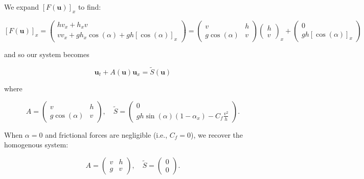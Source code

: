 We expand $[F(\textbf{u})]_x$ to find:

$$
[F(\textbf{u})]_x = \begin{pmatrix}
    h v_x + h_x v \\
    v v_x + g h_x \cos{(\alpha)} + g h [\cos{(\alpha)}]_x
\end{pmatrix} = \begin{pmatrix}
    v                & h \\
    g \cos{(\alpha)} & v
\end{pmatrix} \begin{pmatrix}
    h \\
    v
\end{pmatrix}_x + \begin{pmatrix}
    0 \\
    g h [\cos{(\alpha)}]_x
\end{pmatrix}
$$

and so our system becomes

$$
\textbf{u}_t + A(\textbf{u}) \textbf{u}_x = \tilde{S}(\textbf{u})
$$

where 

$$
A = \begin{pmatrix}
    v                & h \\
    g \cos{(\alpha)} & v
\end{pmatrix}, \quad \tilde{S} = \begin{pmatrix}
    0 \\
    g h \sin{(\alpha)} (1 - \alpha_x) - C_f \frac{v^2}{h}
\end{pmatrix}.
$$

When $\alpha = 0$ and frictional forces are negligible (i.e., $C_f = 0$), we recover the homogenous system:

$$
A = \begin{pmatrix}
    v  & h \\
    g  & v
\end{pmatrix}, \quad \tilde{S} = \begin{pmatrix}
    0 \\
    0
\end{pmatrix}.
$$
